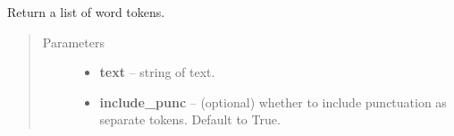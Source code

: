 \documentclass[letterpaper,10pt,english]{sphinxmanual}
\begin{document}
\begin{fulllineitems}
\begin{fulllineitems}
\end{fulllineitems}


\begin{fulllineitems}
\label{api_reference:textblob_de.tokenizers.PatternTokenizer.tokenize}
Return a list of word tokens.
\begin{quote}\begin{description}
\item[{Parameters}] \leavevmode\begin{itemize}
\item {} 
\textbf{text} -- string of text.

\item {} 
\textbf{include\_punc} -- (optional) whether to include punctuation as separate
tokens. Default to True.

\end{itemize}

\end{description}\end{quote}

\end{fulllineitems}


\end{fulllineitems}

\end{document}
